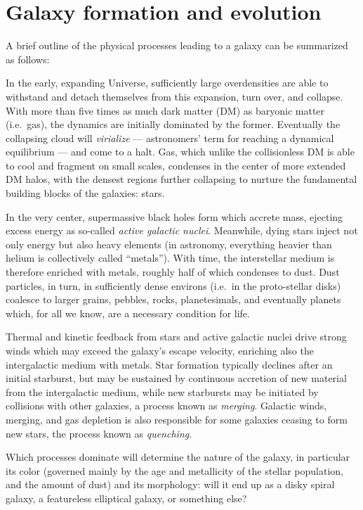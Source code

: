 \documentclass[useAMS]{aa}
\begin{document}
\section{Galaxy formation and evolution}
\label{sec:galaxies}

A brief outline of the physical processes leading to a galaxy can be summarized as follows:

In the early, expanding Universe, sufficiently large overdensities are able to withstand and detach themselves from this expansion, turn over, and collapse.
With more than five times as much dark matter (DM) as baryonic matter (i.e.~gas), the dynamics are initially dominated by the former.
Eventually the collapsing cloud will \emph{virialize} --- astronomers' term for reaching a dynamical equilibrium --- and come to a halt.
Gas, which unlike the collisionless DM is able to cool and fragment on small scales, condenses in the center of more extended DM halos, with the densest regions further collapsing to nurture the fundamental building blocks of the galaxies: stars.

In the very center, supermassive black holes form which accrete mass, ejecting excess energy as so-called \emph{active galactic nuclei}.
Meanwhile, dying stars inject not only energy but also heavy elements (in astronomy, everything heavier than helium is collectively called ``metals'').
With time, the interstellar medium is therefore enriched with metals, roughly half of which condenses to dust.
Dust particles, in turn, in sufficiently dense environs (i.e.~in the proto-stellar disks) coalesce to larger grains, pebbles, rocks, planetesimals, and eventually planets which, for all we know, are a necessary condition for life.

Thermal and kinetic feedback from stars and active galactic nuclei drive strong winds which may exceed the galaxy's escape velocity, enriching also the intergalactic medium with metals.
Star formation typically declines after an initial starburst, but may be sustained by continuous accretion of new material from the intergalactic medium, while new starbursts may be initiated by collisions with other galaxies, a process known as \emph{merging}.
Galactic winds, merging, and gas depletion is also responsible for some galaxies ceasing to form new stars, the process known as \emph{quenching}.

Which processes dominate will determine the nature of the galaxy, in particular its color (governed mainly by the age and metallicity of the stellar population, and the amount of dust) and its morphology: will it end up as a disky spiral galaxy, a featureless elliptical galaxy, or something else?
\end{document}
